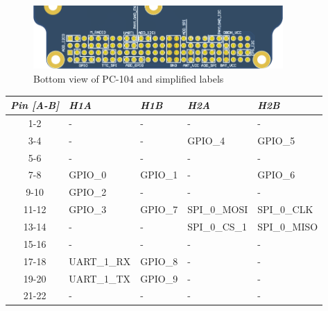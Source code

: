 \begin{figure}[!ht]
    \begin{center}
        \includegraphics[width=0.85\textwidth]{figures/pc-104-scheme.png}
        \caption{Bottom view of PC-104 and simplified labels}
        \label{fig:pc-104-scheme}
    \end{center}
\end{figure}

\begin{table}[!h]
    \centering
    \begin{tabular}{cllll}
        \toprule[1.5pt]
        \textit{Pin [A-B]} & \textit{H1A}     & \textit{H1B}     & \textit{H2A}  & \textit{H2B}  \\
        \midrule
        1-2                & -                & -                & -             & -             \\
        3-4                & -                & -                & GPIO\_4       & GPIO\_5       \\
        5-6                & -                & -                & -             & -             \\
        7-8                & GPIO\_0          & GPIO\_1          & -             & GPIO\_6       \\
        9-10               & GPIO\_2          & -                & -             & -             \\
        11-12              & GPIO\_3          & GPIO\_7          & SPI\_0\_MOSI  & SPI\_0\_CLK   \\
        13-14              & -                & -                & SPI\_0\_CS\_1 & SPI\_0\_MISO  \\
        15-16              & -                & -                & -             & -             \\
        17-18              & UART\_1\_RX      & GPIO\_8          & -             & -             \\
        19-20              & UART\_1\_TX      & GPIO\_9          & -             & -             \\
        21-22              & -                & -                & -             & -             \\

\end{tabular}
\end{table}
